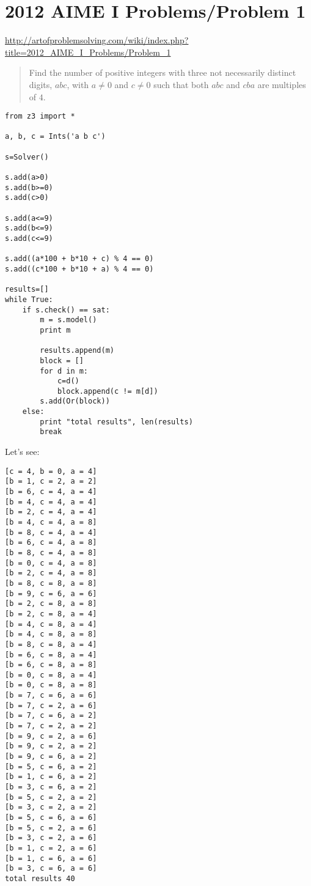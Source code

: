 \section{2012 AIME I Problems/Problem 1}

\url{http://artofproblemsolving.com/wiki/index.php?title=2012_AIME_I_Problems/Problem_1}

\begin{framed}
\begin{quotation}

Find the number of positive integers with three not necessarily distinct digits,
$abc$, with $a \neq 0$ and $c \neq 0$ such that both $abc$ and $cba$ are multiples of $4$.

\end{quotation}
\end{framed}

\begin{lstlisting}[style=custompy]
from z3 import *

a, b, c = Ints('a b c')

s=Solver()

s.add(a>0)
s.add(b>=0)
s.add(c>0)

s.add(a<=9)
s.add(b<=9)
s.add(c<=9)

s.add((a*100 + b*10 + c) % 4 == 0)
s.add((c*100 + b*10 + a) % 4 == 0)

results=[]
while True:
    if s.check() == sat:
        m = s.model()
        print m

        results.append(m)
        block = []
        for d in m:
            c=d()
            block.append(c != m[d])
        s.add(Or(block))
    else:
        print "total results", len(results)
        break
\end{lstlisting}

Let's see:

\begin{lstlisting}
[c = 4, b = 0, a = 4]
[b = 1, c = 2, a = 2]
[b = 6, c = 4, a = 4]
[b = 4, c = 4, a = 4]
[b = 2, c = 4, a = 4]
[b = 4, c = 4, a = 8]
[b = 8, c = 4, a = 4]
[b = 6, c = 4, a = 8]
[b = 8, c = 4, a = 8]
[b = 0, c = 4, a = 8]
[b = 2, c = 4, a = 8]
[b = 8, c = 8, a = 8]
[b = 9, c = 6, a = 6]
[b = 2, c = 8, a = 8]
[b = 2, c = 8, a = 4]
[b = 4, c = 8, a = 4]
[b = 4, c = 8, a = 8]
[b = 8, c = 8, a = 4]
[b = 6, c = 8, a = 4]
[b = 6, c = 8, a = 8]
[b = 0, c = 8, a = 4]
[b = 0, c = 8, a = 8]
[b = 7, c = 6, a = 6]
[b = 7, c = 2, a = 6]
[b = 7, c = 6, a = 2]
[b = 7, c = 2, a = 2]
[b = 9, c = 2, a = 6]
[b = 9, c = 2, a = 2]
[b = 9, c = 6, a = 2]
[b = 5, c = 6, a = 2]
[b = 1, c = 6, a = 2]
[b = 3, c = 6, a = 2]
[b = 5, c = 2, a = 2]
[b = 3, c = 2, a = 2]
[b = 5, c = 6, a = 6]
[b = 5, c = 2, a = 6]
[b = 3, c = 2, a = 6]
[b = 1, c = 2, a = 6]
[b = 1, c = 6, a = 6]
[b = 3, c = 6, a = 6]
total results 40
\end{lstlisting}


